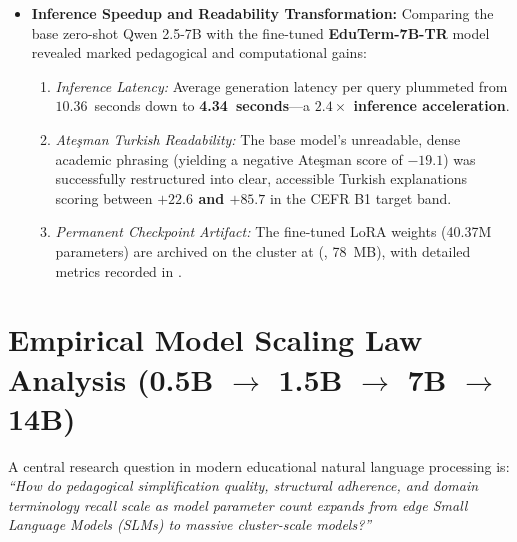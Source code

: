 \documentclass[a4paper,12pt]{report}
\begin{document}
\begin{itemize}
    \item \textbf{Inference Speedup and Readability Transformation:} Comparing the base zero-shot Qwen 2.5-7B with the fine-tuned \textbf{EduTerm-7B-TR} model revealed marked pedagogical and computational gains:
    \begin{enumerate}
        \item \emph{Inference Latency:} Average generation latency per query plummeted from $10.36$~seconds down to \textbf{4.34~seconds}---a \textbf{$2.4\times$ inference acceleration}.
        \item \emph{Ate\c{s}man Turkish Readability:} The base model's unreadable, dense academic phrasing (yielding a negative Ate\c{s}man score of $-19.1$) was successfully restructured into clear, accessible Turkish explanations scoring between \textbf{$+22.6$ and $+85.7$} in the CEFR B1 target band.
        \item \emph{Permanent Checkpoint Artifact:} The fine-tuned LoRA weights (40.37M parameters) are archived on the cluster at  (, 78~MB), with detailed metrics recorded in .
    \end{enumerate}
\end{itemize}

\section{Empirical Model Scaling Law Analysis (0.5B \texorpdfstring{$\to$}{->} 1.5B \texorpdfstring{$\to$}{->} 7B \texorpdfstring{$\to$}{->} 14B)}
A central research question in modern educational natural language processing is: \emph{``How do pedagogical simplification quality, structural adherence, and domain terminology recall scale as model parameter count expands from edge Small Language Models (SLMs) to massive cluster-scale models?''}
\end{document}
